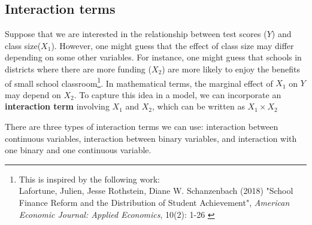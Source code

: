 \documentclass[12pt]{article}
\theoremstyle{definition}
\theoremstyle{property}
\theoremstyle{assumption}
\theoremstyle{example}
\theoremstyle{comment}
\begin{document}
\subsection{Interaction terms}
Suppose that we are interested in the relationship between test scores ($Y$) and class size($X_1$). However, one might guess that the effect of class size may differ depending on some other variables. For instance, one might guess that schools in districts where there are more funding ($X_2$) are more likely to enjoy the benefits of small school classroom\footnote{\scriptsize{This is inspired by the following work: \\ Lafortune, Julien, Jesse Rothstein, Diane W. Schanzenbach (2018) "School Finance Reform and the Distribution of Student Achievement", \textit{American Economic Journal: Applied Economics}, 10(2): 1-26 }}. In mathematical terms, the marginal effect of $X_1$ on $Y$ may depend on $X_2$. To capture this idea in a model, we can incorporate an \textbf{interaction term} involving $X_1$ and $X_2$, which can be written as $X_1 \times X_2$ \par\medskip
There are three types of interaction terms we can use: interaction between continuous variables, interaction between binary variables, and interaction with one binary and one continuous variable.
\end{document}
